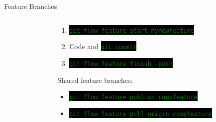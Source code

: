 \documentclass[
14pt,
aspectratio=169,
usenames,
dvipsnames,
x11names]{beamer}
\newcommand{\code}[1]{{\small\setlength{\fboxsep}{2pt}\colorbox{black}{\textcolor{green}{\texttt{#1}}}}}
\begin{document}
\begin{frame}{Feature Branches}
\begin{columns}
\begin{column}{.25\linewidth}
    \end{column}
    \begin{column}{.75\linewidth}
      \minipage[c][0.75\textheight][s]{\columnwidth}
      \begin{enumerate} \setlength{\itemsep}{\fill}
      \item \code{git flow feature start mynewfeature}
      \item Code and \code{git commit}
      \item \code{git flow feature finish --push}
      \end{enumerate}
      \vfill
      \pause
      Shared feature branches:
      \begin{itemize} \setlength{\itemsep}{\fill}
      \item \code{git flow feature publish coopfeature}
      \item \code{git flow feature pull origin coopfeature}
      \end{itemize}
      \endminipage
    \end{column}
  \end{columns}
\end{frame}
\end{document}
